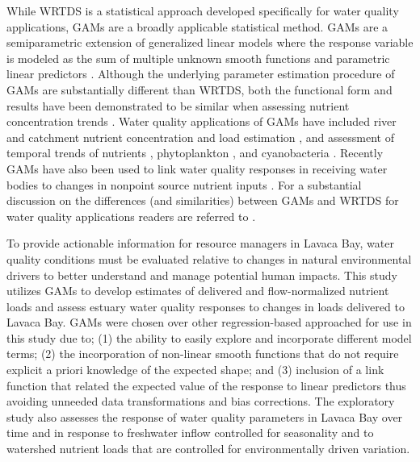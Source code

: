 \documentclass[fleqn,10pt,lineno]{wlpeerj} %
\begin{document}
While WRTDS is a statistical approach developed specifically for water
quality applications, GAMs are a broadly applicable statistical method.
GAMs are a semiparametric extension of generalized linear models where
the response variable is modeled as the sum of multiple unknown smooth
functions and parametric linear predictors
\autocite{woodFastStableRestricted2011}. Although the underlying
parameter estimation procedure of GAMs are substantially different than
WRTDS, both the functional form and results have been demonstrated to be
similar when assessing nutrient concentration trends
\autocite{beckNumericalQualitativeContrasts2017}. Water quality
applications of GAMs have included river and catchment nutrient
concentration and load estimation
\autocite{wangLoadEstimationUncertainties2011,kroonRiverLoadsSuspended2012,kuhnertQuantifyingTotalSuspended2012,robson_prediction_2015-1,hagemannEstimatingNutrientOrganic2016,mcdowell_implications_2021,biagi_novel_2022},
and assessment of temporal trends of nutrients
\autocite{beckNumericalQualitativeContrasts2017,murphyGeneralizedAdditiveModel2019},
phytoplankton \autocite{bergbuschUnexpectedShiftPhytoplankton2021}, and
cyanobacteria \autocite{hayesEffectsLakeWarming2020}. Recently GAMs have
also been used to link water quality responses in receiving water bodies
to changes in nonpoint source nutrient inputs
\autocite{murphyNutrientImprovementsChesapeake2022}. For a substantial
discussion on the differences (and similarities) between GAMs and WRTDS
for water quality applications readers are referred to
\textcite{beckNumericalQualitativeContrasts2017}.

To provide actionable information for resource managers in Lavaca Bay,
water quality conditions must be evaluated relative to changes in
natural environmental drivers to better understand and manage potential
human impacts. This study utilizes GAMs to develop estimates of
delivered and flow-normalized nutrient loads and assess estuary water
quality responses to changes in loads delivered to Lavaca Bay. GAMs were
chosen over other regression-based approached for use in this study due
to; (1) the ability to easily explore and incorporate different model
terms; (2) the incorporation of non-linear smooth functions that do not
require explicit a priori knowledge of the expected shape; and (3)
inclusion of a link function that related the expected value of the
response to linear predictors thus avoiding unneeded data
transformations and bias corrections. The exploratory study also
assesses the response of water quality parameters in Lavaca Bay over
time and in response to freshwater inflow controlled for seasonality and
to watershed nutrient loads that are controlled for environmentally
driven variation.
\end{document}
